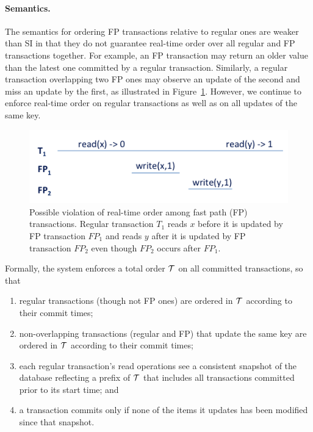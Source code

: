 \paragraph{Semantics.}

The semantics for ordering FP transactions relative to regular ones are
weaker than SI in that they do not guarantee real-time order over all regular
and FP transactions together. For example, an FP transaction may return 
an older value than the latest one committed by a regular transaction. Similarly, a regular transaction overlapping
two FP ones may observe an update of the second and miss an update by the first,  as illustrated in Figure~\ref{fig:ltx-rt}.
However, we continue to enforce real-time order on regular transactions as well as on all updates of the same key.

\begin{figure}[h]
\includegraphics[width=\columnwidth]{figs/FP-semantics}
\caption{Possible violation of real-time order among fast path (FP) transactions. Regular transaction $T_1$
reads $x$ before it is updated by FP transaction $FP_1$ and reads $y$ after it is updated by FP transaction $FP_2$ even 
though $FP_2$ occurs after $FP_1$. 
}
\label{fig:ltx-rt}
\end{figure}

Formally, the system enforces a total order ${\cal T}$ on all committed transactions, so that
\begin{enumerate}
    \setlength{\itemsep}{0pt}
    \setlength{\parskip}{0pt}
    \setlength{\parsep}{2pt}  
\item
regular transactions (though not FP ones) are ordered in ${\cal T}$  according to their commit times;
\item
non-overlapping transactions (regular and FP) that update the same key are ordered in ${\cal T}$  according to their commit times;
\item
each regular transaction's read operations see a consistent snapshot of the database reflecting 
a prefix of  ${\cal T}$ that includes  all transactions committed prior to
its start time; and 
\item
 a transaction commits only if none of the items it updates has been modified since that snapshot.
 \end{enumerate}


